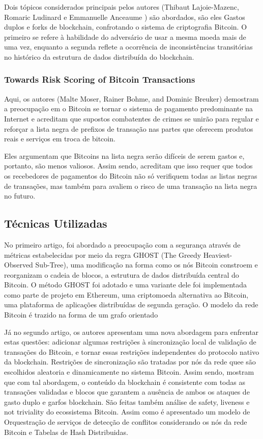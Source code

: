 \documentclass[conference]{IEEEtran}
\begin{document}
Dois tópicos considerados principais pelos autores (Thibaut Lajoie-Mazenc, Romaric Ludinard e Emmanuelle Anceaume
) são abordados, são eles Gastos duplos e forks de blockchain, confrotando o sistema de criptografia Bitcoin. O primeiro se refere à habilidade do adversário de usar a mesma moeda mais de uma vez, enquanto a segunda reflete a ocorrência de inconsistências transitórias no histórico da estrutura de dados distribuída do blockchain. 



\subsubsection{Towards Risk Scoring of Bitcoin Transactions}

Aqui, os autores (Malte Moser, Rainer Bohme, and Dominic Breuker) demostram a preocupação em o Bitcoin se tornar o sistema de pagamento predominante na Internet e acreditam que supostos combatentes de crimes se unirão para regular e reforçar a lista negra de prefixos de transação nas partes que oferecem produtos reais e serviços em troca de bitcoin. 

Eles argumentam que Bitcoins na lista negra serão difíceis de serem gastos e, portanto, são menos valiosos. Assim sendo, acreditam que isso requer que todos os recebedores de pagamentos do Bitcoin não só verifiquem todas as listas negras de transações, mas também para avaliem o risco de uma transação na lista negra no futuro. 

\subsection{Técnicas Utilizadas}

No primeiro artigo, foi abordado a preocupação com a segurança através de métricas estabelecidas por meio da regra GHOST (The Greedy Heaviest-Observed Sub-Tree), uma modificação na forma como os nós Bitcoin constroem e reorganizam o cadeia de blocos, a estrutura de dados distribuída central do Bitcoin. O método GHOST foi adotado e uma variante dele foi implementada como parte de projeto em Ethereum, uma criptomoeda alternativa ao Bitcoin, uma plataforma de aplicações distribuídas de segunda geração. O modelo da rede Bitcoin é trazido na forma de um grafo orientado

Já no segundo artigo, os autores apresentam uma nova abordagem para enfrentar estas questões: adicionar algumas restrições à sincronização local de validação de transações do Bitcoin, e tornar essas restrições independentes do protocolo nativo da blockchain.  Restrições de sincronização são tratadas por nós da rede quee são escolhidos aleatoria e dinamicamente no sistema Bitcoin. Assim sendo, mostram que com tal abordagem, o conteúdo da blockchain é consistente com todas as transações validadas e blocos que garantem a ausência de ambos os ataques de gasto duplo e garfos blockchain. São feitas também análise de safety, liveness e not triviality do ecossistema Bitcoin. Assim como é apresentado um modelo de Orquestração de serviços de detecção de conflitos considerando os nós da rede Bitcoin e Tabelas de Hash Distribuidas. 
\end{document}
